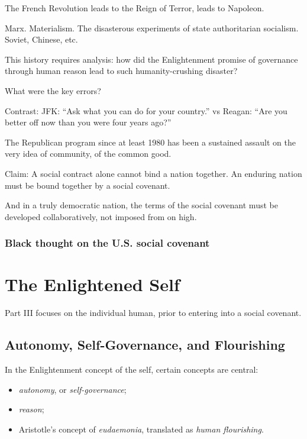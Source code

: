 \documentclass[
]{book}
\providecommand{\tightlist}{%
  \setlength{\itemsep}{0pt}\setlength{\parskip}{0pt}}
\begin{document}
The French Revolution leads to the Reign of Terror, leads to Napoleon.

Marx. Materialism. The disasterous experiments of state authoritarian socialism. Soviet, Chinese, etc.

This history requires analysis: how did the Enlightenment promise of governance through human reason lead to such humanity-crushing disaster?

What were the key errors?

Contrast:
JFK: ``Ask what you can do for your country.''
vs Reagan: ``Are you better off now than you were four years ago?''

The Republican program since at least 1980 has been a sustained assault on the very idea of community, of the common good.

Claim: A social contract alone cannot bind a nation together. An enduring nation must be bound together by a social covenant.

And in a truly democratic nation, the terms of the social covenant must be developed collaboratively, not imposed from on high.

\hypertarget{black-thought-on-the-u.s.-social-covenant}{%
\section{Black thought on the U.S. social covenant}\label{black-thought-on-the-u.s.-social-covenant}}

\hypertarget{part-the-enlightened-self}{%
\part{The Enlightened Self}\label{part-the-enlightened-self}}

Part III focuses on the individual human, prior to entering into a social covenant.

\hypertarget{autonomy-self-governance-and-flourishing}{%
\chapter{Autonomy, Self-Governance, and Flourishing}\label{autonomy-self-governance-and-flourishing}}

In the Enlightenment concept of the self, certain concepts are central:

\begin{itemize}
\tightlist
\item
  \emph{autonomy}, or \emph{self-governance};
\item
  \emph{reason};
\item
  Aristotle's concept of \emph{eudaemonia}, translated as \emph{human flourishing}.
\end{itemize}
\end{document}
